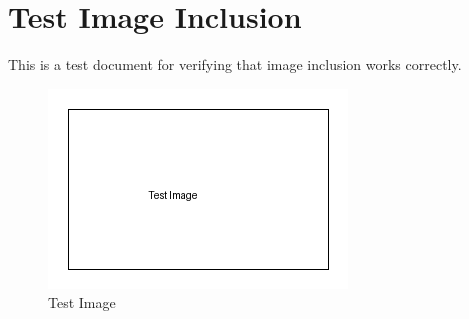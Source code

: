 \documentclass{article}
\begin{document}
\section{Test Image Inclusion}

This is a test document for verifying that image inclusion works correctly.

\begin{figure}[htbp]
    \centering
    \includegraphics{test_image.png}
    \caption{Test Image}
    \label{fig:test}
\end{figure}
\end{document}
